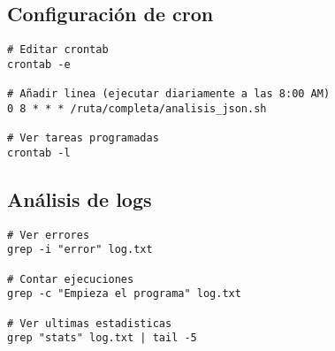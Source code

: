 \subsection{Configuración de cron}

\begin{lstlisting}[style=bash]
# Editar crontab
crontab -e

# Añadir linea (ejecutar diariamente a las 8:00 AM)
0 8 * * * /ruta/completa/analisis_json.sh

# Ver tareas programadas
crontab -l
\end{lstlisting}

\subsection{Análisis de logs}

\begin{lstlisting}[style=bash]
# Ver errores
grep -i "error" log.txt

# Contar ejecuciones
grep -c "Empieza el programa" log.txt

# Ver ultimas estadisticas
grep "stats" log.txt | tail -5
\end{lstlisting}
